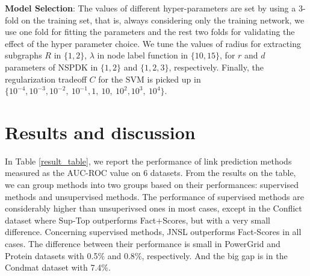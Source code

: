 \documentclass[runningheads,a4paper]{llncs}
\begin{document}
\textbf{Model Selection}: The values of different hyper-parameters are set by using a 3-fold on the training set, that is, always considering only the training network, we use one fold for fitting the parameters and the rest two folds for validating the effect of the hyper parameter choice. We tune the values of radius for extracting subgraphs $R$ in $\lbrace 1, 2 \rbrace$, $\lambda$ in node label function in $\lbrace 10, 15 \rbrace$, for $r$ and $d$ parameters of NSPDK in $\lbrace  1, 2 \rbrace$ and $\lbrace  1, 2, 3 \rbrace$, respectively. Finally, the regularization tradeoff $C$ for the SVM is picked up in $\lbrace 10^{-4}, 10^{-3}, 10^{-2},\ 10^{-1}, 1,\ 10,\ 10^2, 10^3,\ 10^4 \rbrace$.

\section{Results and discussion}
In Table \ref{result_table}, we report the performance of link prediction methods measured as the AUC-ROC value on 6 datasets. From the results on the table, we can group methods into two groups based on their performances: supervised methods and unsupervised methods. The performance of supervised methods are considerably higher than unsuperivsed ones in most cases, except in the Conflict dataset where Sup-Top outperforms Fact+Scores, but with a very small difference. Concerning supervised methods, JNSL outperforms Fact-Scores in all cases. The difference between their performance is small in PowerGrid and Protein datasets with 0.5$\%$ and 0.8$\%$, respectively. And the big gap is in the Condmat dataset with 7.4$\%$. 
\end{document}
